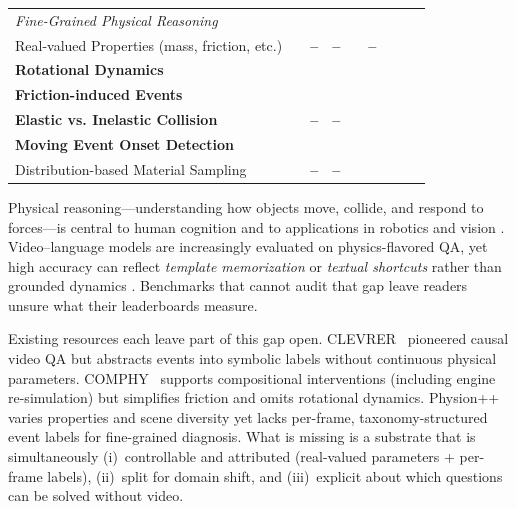 \documentclass[conference]{IEEEtran}
\newcommand{\cmark}{\textcolor{green!60!black}{\ding{51}}} %
\newcommand{\xmark}{\textcolor{red}{\ding{55}}}            %
\newcommand{\warn}{\textbf{--}}
\begin{document}
\begin{table}[!h]
\begin{tabular}{p{5.1cm}cccccccc}
\midrule
\multicolumn{9}{l}{\textit{Fine-Grained Physical Reasoning}} \\
Real-valued Properties (mass, friction, etc.) & \cmark & \warn & \warn & \xmark & \warn & \xmark & \xmark & \xmark \\
\textbf{Rotational Dynamics}         & \textbf{\cmark} & \xmark & \xmark & \xmark & \xmark & \xmark & \xmark & \xmark \\
\textbf{Friction-induced Events}     & \textbf{\cmark} & \xmark & \xmark & \xmark & \xmark & \xmark & \xmark & \xmark \\
\textbf{Elastic vs. Inelastic Collision} & \textbf{\cmark} & \warn  & \warn  & \xmark & \xmark & \xmark & \xmark & \xmark \\
\textbf{Moving Event Onset Detection}  & \textbf{\cmark} & \xmark & \xmark & \xmark & \xmark & \xmark & \xmark & \xmark \\
Distribution-based Material Sampling & \cmark & \warn  & \warn  & \xmark & \xmark & \xmark & \xmark & \xmark \\
\bottomrule
\end{tabular}
\label{tab:phlop_full_comparison}
\end{table}


Physical reasoning---understanding how objects move, collide, and respond to forces---is central to human cognition and to applications in robotics and vision \cite{yi2020clevrer,tung2023physion++,battaglia2013simulation,piloto2022intuitive}.
Video--language models are increasingly evaluated on physics-flavored QA, yet high accuracy can reflect \emph{template memorization} or \emph{textual shortcuts} rather than grounded dynamics \cite{tung2023physion++,melnik2023benchmarks,hofherr2023neural}.
Benchmarks that cannot audit that gap leave readers unsure what their leaderboards measure.

Existing resources each leave part of this gap open.
CLEVRER~\cite{yi2020clevrer} pioneered causal video QA but abstracts events into symbolic labels without continuous physical parameters.
COMPHY~\cite{chen2022comphy} supports compositional interventions (including engine re-simulation) but simplifies friction and omits rotational dynamics.
Physion++~\cite{tung2023physion++} varies properties and scene diversity yet lacks per-frame, taxonomy-structured event labels for fine-grained diagnosis.
What is missing is a substrate that is simultaneously (i)~controllable and attributed (real-valued parameters + per-frame labels), (ii)~split for domain shift, and (iii)~explicit about which questions can be solved without video.
\end{document}
